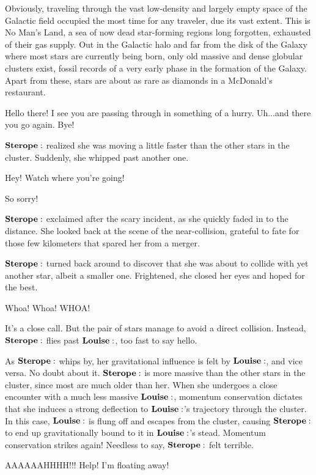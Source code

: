 \documentclass[main.tex]{subfiles}
\begin{document}
Obviously, traveling through the vast low-density and largely empty space of the Galactic field occupied the most time for any traveler, due its vast extent.  This is No Man's Land, a sea of now dead star-forming regions long forgotten, exhausted of their gas supply.  Out in the Galactic halo and far from the disk of the Galaxy where most stars are currently being born, only old massive and dense globular clusters exist, fossil records of a very early phase in the formation of the Galaxy.  Apart from these, stars are about as rare as diamonds in a McDonald's restaurant. 

\Jane Hello there!  I see you are passing through in something of a hurry.  Uh...and there you go again.  Bye!

$\Sterope$ realized she was moving a little faster than the other stars in the cluster.  Suddenly, she whipped past another one.

\Dan Hey!  Watch where you're going!

\Sterope So sorry!

$\Sterope$ exclaimed after the scary incident, as she quickly faded in to the distance.  She looked back at the scene of the near-collision, grateful to fate for those few kilometers that spared her from a merger.


$\Sterope$ turned back around to discover that she was about to collide with yet another star, albeit a smaller one.  Frightened, she closed her eyes and hoped for the best.  

\Louise Whoa! Whoa! WHOA!

It's a close call.  But the pair of stars manage to avoid a direct collision.  Instead, $\Sterope$ flies past $\Louise$, too fast to say hello.

As $\Sterope$ whips by, her gravitational influence is felt by $\Louise$, and vice versa.  No doubt about it.  $\Sterope$ is more massive than the other stars in the cluster, since most are much older than her.  When she undergoes a close encounter with a much less massive $\Louise$, momentum conservation dictates that she induces a strong deflection to $\Louise$'s trajectory through the cluster.  In this case, $\Louise$ is flung off and escapes from the cluster, causing $\Sterope$ to end up gravitationally bound to it in $\Louise$'s stead.  Momentum conservation strikes again!  Needless to say, $\Sterope$ felt terrible.

\Louise  AAAAAAHHHH!!! Help!  I'm floating away!
\end{document}
